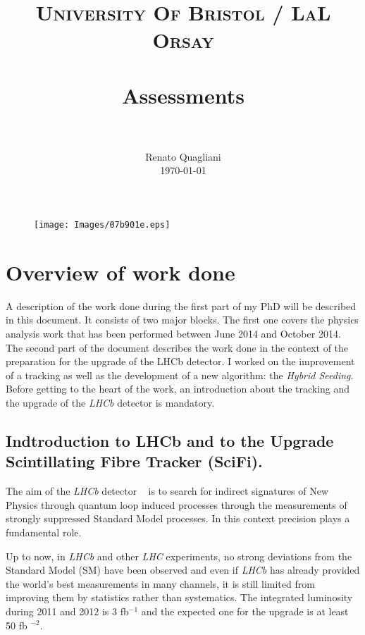 \documentclass[paper=a4, fontsize=10pt]{scrartcl}
\title{
		\usefont{OT1}{bch}{b}{n}
		\normalfont \normalsize \textsc{University Of Bristol / LaL Orsay} \\ [25pt]
		\horrule{0.5pt} \\[0.4cm]
		\huge Assessments \\
		\horrule{2pt} \\[0.5cm]
}
\author{
		\normalfont 								\normalsize
        Renato Quagliani\\[-3pt]		\normalsize
        \today
}
\date{}
\numberwithin{equation}{section}		%
\numberwithin{figure}{section}			%
\numberwithin{table}{section}				%
\begin{document}
\maketitle
\begin{figure}
\begin{center}
\texttt{[image: Images/07b901e.eps]}
\end{center}
\end{figure}
\section{Overview of work done}
A description of the work done during the first part of my PhD will be described in this document. It consists of two major blocks. The first one covers the physics analysis work that has been performed between June 2014 and October 2014. The second part of the document describes the work done in the context of the preparation for the upgrade of the LHCb detector. I worked on the improvement of a tracking as well as the development of a new algorithm: the \textit{Hybrid Seeding}.
Before getting to the heart of the work, an introduction about the tracking and the upgrade of the \textit{LHCb} detector is mandatory.
\subsection{Indtroduction to LHCb and to the Upgrade Scintillating Fibre Tracker (SciFi).}
The aim of the \textit{LHCb} detector ~\cite{Blake1} is to search for indirect signatures of New Physics through quantum loop induced processes through the measurements of strongly suppressed Standard Model processes.
In this context precision plays a fundamental role. 

Up to now, in \textit{LHCb} and other \textit{LHC} experiments, no strong deviations from the Standard Model (SM) have been observed and even if \textit{LHCb} has already provided the world's best measurements in many channels, it is still limited from improving them by statistics rather than systematics.
The integrated luminosity during 2011 and 2012 is 3 fb$^{-1}$ and the expected one for the upgrade is at least 50 fb $^{-2}$.
\end{document}

